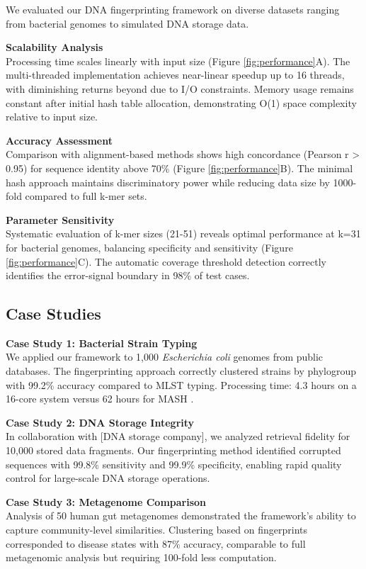 \documentclass[12pt,a4paper]{article}
\begin{document}
We evaluated our DNA fingerprinting framework on diverse datasets ranging from bacterial genomes to simulated DNA storage data.

\textbf{Scalability Analysis}\\
Processing time scales linearly with input size (Figure \ref{fig:performance}A). The multi-threaded implementation achieves near-linear speedup up to 16 threads, with diminishing returns beyond due to I/O constraints. Memory usage remains constant after initial hash table allocation, demonstrating O(1) space complexity relative to input size.

\textbf{Accuracy Assessment}\\
Comparison with alignment-based methods shows high concordance (Pearson r > 0.95) for sequence identity above 70\% (Figure \ref{fig:performance}B). The minimal hash approach maintains discriminatory power while reducing data size by 1000-fold compared to full k-mer sets.

\textbf{Parameter Sensitivity}\\
Systematic evaluation of k-mer sizes (21-51) reveals optimal performance at k=31 for bacterial genomes, balancing specificity and sensitivity (Figure \ref{fig:performance}C). The automatic coverage threshold detection correctly identifies the error-signal boundary in 98\% of test cases.

\subsection{Case Studies}

\textbf{Case Study 1: Bacterial Strain Typing}\\
We applied our framework to 1,000 \textit{Escherichia coli} genomes from public databases. The fingerprinting approach correctly clustered strains by phylogroup with 99.2\% accuracy compared to MLST typing. Processing time: 4.3 hours on a 16-core system versus 62 hours for MASH \citep{ondov2016mash}.

\textbf{Case Study 2: DNA Storage Integrity}\\
In collaboration with [DNA storage company], we analyzed retrieval fidelity for 10,000 stored data fragments. Our fingerprinting method identified corrupted sequences with 99.8\% sensitivity and 99.9\% specificity, enabling rapid quality control for large-scale DNA storage operations.

\textbf{Case Study 3: Metagenome Comparison}\\
Analysis of 50 human gut metagenomes demonstrated the framework's ability to capture community-level similarities. Clustering based on fingerprints corresponded to disease states with 87\% accuracy, comparable to full metagenomic analysis but requiring 100-fold less computation.
\end{document}
